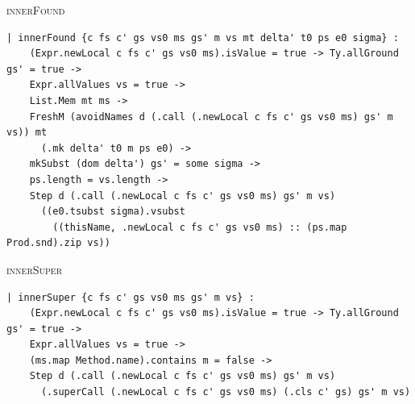 \begin{cmp}{\textsc{innerFound}}
\begin{paperside}
\end{paperside}
\begin{leanside}
\begin{lstlisting}[style=leanside]
| innerFound {c fs c' gs vs0 ms gs' m vs mt delta' t0 ps e0 sigma} :
    (Expr.newLocal c fs c' gs vs0 ms).isValue = true -> Ty.allGround gs' = true ->
    Expr.allValues vs = true ->
    List.Mem mt ms ->
    FreshM (avoidNames d (.call (.newLocal c fs c' gs vs0 ms) gs' m vs)) mt
      (.mk delta' t0 m ps e0) ->
    mkSubst (dom delta') gs' = some sigma ->
    ps.length = vs.length ->
    Step d (.call (.newLocal c fs c' gs vs0 ms) gs' m vs)
      ((e0.tsubst sigma).vsubst
        ((thisName, .newLocal c fs c' gs vs0 ms) :: (ps.map Prod.snd).zip vs))
\end{lstlisting}
\end{leanside}
\end{cmp}

\begin{cmp}{\textsc{innerSuper}}
\begin{paperside}
\end{paperside}
\begin{leanside}
\begin{lstlisting}[style=leanside]
| innerSuper {c fs c' gs vs0 ms gs' m vs} :
    (Expr.newLocal c fs c' gs vs0 ms).isValue = true -> Ty.allGround gs' = true ->
    Expr.allValues vs = true ->
    (ms.map Method.name).contains m = false ->
    Step d (.call (.newLocal c fs c' gs vs0 ms) gs' m vs)
      (.superCall (.newLocal c fs c' gs vs0 ms) (.cls c' gs) gs' m vs)
\end{lstlisting}
\end{leanside}
\end{cmp}


